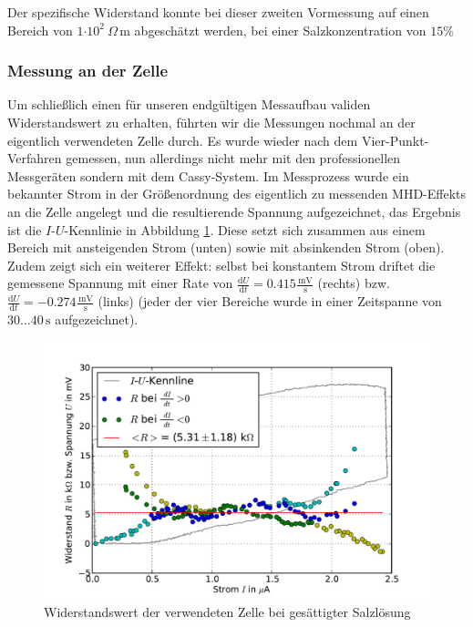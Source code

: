 \documentclass[11pt]{scrartcl}
\newcommand{\unit}[1]{\ensuremath{\,\mathrm{#1}}} %
\newcommand{\dif}{\ensuremath{\mathrm{d}}}
\newcommand{\ee}[1]{\ensuremath{\cdot\! 10^{#1}}}
\begin{document}
Der spezifische Widerstand konnte bei dieser zweiten Vormessung auf einen Bereich von $1 \ee{2} \ \Omega \unit{m}$ abgeschätzt werden, bei einer Salzkonzentration von $15 \%$

\subsubsection{Messung an der Zelle}
Um schließlich einen für unseren endgültigen Messaufbau validen Widerstandswert zu erhalten, führten wir die Messungen nochmal an der eigentlich verwendeten Zelle durch. Es wurde wieder nach dem Vier-Punkt-Verfahren gemessen, nun allerdings nicht mehr mit den professionellen Messgeräten sondern mit dem Cassy-System. Im Messprozess wurde ein bekannter Strom in der Größenordnung des eigentlich zu messenden MHD-Effekts an die Zelle angelegt und die resultierende Spannung aufgezeichnet, das Ergebnis ist die $I$-$U$-Kennlinie in Abbildung \ref{widerstand_zelle}. Diese setzt sich zusammen aus einem Bereich mit ansteigenden Strom (unten) sowie mit absinkenden Strom (oben). Zudem zeigt sich ein weiterer Effekt: selbst bei konstantem Strom driftet die gemessene Spannung mit einer Rate von $\frac{\dif U}{\dif t} = 0.415 \frac{\unit{mV}}{\unit{s}}$ (rechts) bzw. $\frac{\dif U}{\dif t} = -0.274 \frac{\unit{mV}}{\unit{s}}$ (links) (jeder der vier Bereiche wurde in einer Zeitspanne von $30\ldots40 \unit{s}$ aufgezeichnet).

\begin{figure}[ht]
\begin{center}
\includegraphics[width=1.0\textwidth]{images/messung_widerstand.pdf}
\end{center}
\vspace{-1.5\baselineskip}
\caption{Widerstandswert der verwendeten Zelle bei gesättigter Salzlösung}
\label{widerstand_zelle}
\end{figure}
\end{document}
